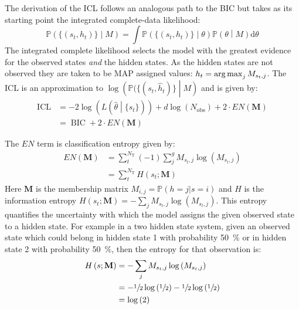 The derivation of the ICL follows an analogous path to the BIC but takes as its starting point the integrated complete-data likelihood: 
\begin{equation}\label{eqn:class_lik_int}
    \mathbb{P}\left(\{(s_t, h_t)\}\middle | M \right) = \int \mathbb{P}\left(\{(s_{t}, h_{t})\}\middle |\theta \right)\mathbb{P}\left(\theta\middle | M\right) \mathrm{d}\theta
\end{equation}
The integrated complete likelihood selects the model with the greatest evidence for the observed states \emph{and} the hidden states. As the hidden states are not observed they are taken to be MAP assigned values: $h_t = \operatorname*{arg\,max}_{j} M_{s_{t}, j}$. The ICL is an approximation to $\log{\left(\mathbb{P}(\{(s_t, \hat{h}_t)\}\middle | M \right)}$ and is given by:\cite{biernackiAssessingMixtureModel2000a}
\begin{equation}\label{eqn:icl}
\begin{split}
        \operatorname{ICL} &= -2\log{\left(L\left(\hat{\theta}\middle|\{s_t\}\right)\right)} + d\log{\left(N_{\mathrm{obs}}\right)} +2\cdot EN\left(\mathbf{M}\right)     \\
        & = \operatorname{BIC} + 2\cdot EN\left(\mathbf{M}\right)
\end{split}
\end{equation}

The $EN$ term  is classification entropy given by:\cite{biernackiAssessingMixtureModel2000a} 
\begin{equation}
\begin{split}
     EN\left(\mathbf{M}\right) & = \sum_{t}^{N_{\mathrm{T}}}(-1)\sum_{j}^{g} M_{s_{t}, j}\log{\left(M_{s_{t}, j}\right)}  \\ 
     & =\sum_{t}^{N_{\mathrm{T}}} H\left(s_{t}; \mathbf{M}\right)
\end{split}
\end{equation}
Here $\mathbf{M}$ is the membership matrix $M_{i,j}= \mathbb{P}(h=j|s=i)$ and $H$ is the information entropy $H\left(s_{t};\mathbf{M}\right) = -\sum_{j} M_{s_{t}, j}\log{\left(M_{s_t, j}\right)}$. This entropy quantifies the uncertainty with which the model assigns the given observed state to a hidden state. For example in a two hidden state system, given an observed state which could belong in hidden state 1 with probability \SI{50}{\percent} or in hidden state 2 with probability \SI{50}{\percent}, then the entropy for that observation is:
\begin{equation}
\begin{split}
    H\left(s; \mathbf{M}\right) & =  -\sum_{j} M_{s_{t}, j}\log{\left(M_{s_t, j}\right)} \\
    & = -\sfrac{1}{2}\log{\left(\sfrac{1}{2}\right)} - \sfrac{1}{2}\log{\left(\sfrac{1}{2}\right)} \\
    & = \log{\left(2\right)}
\end{split}
\end{equation}
 
